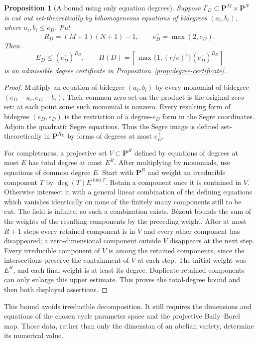 \documentclass[11pt]{article}
\newtheorem{proposition}[theorem]{Proposition}
\theoremstyle{definition}
\theoremstyle{remark}
\begin{document}
\begin{proposition}[A bound using only equation degrees]
\label{prop:bezout-degree}
Suppose $\Gamma_D\subset\mathbf P^M\times\mathbf P^N$
is cut out set-theoretically by bihomogeneous equations of
bidegrees $(a_i,b_i)$, where $a_i,b_i\leq e_D$.
Put
\[
 R_D=(M+1)(N+1)-1,\qquad e_D^+=\max(2,e_D).
\]
Then
\[
 E_D\leq(e_D^+)^{R_D},\qquad
 H(D)=\left\lceil\max\{1,(r/e)^s\}
                       (e_D^+)^{R_D}\right\rceil
\]
is an admissible degree certificate in
Proposition~\ref{prop:degree-certificate}.
\end{proposition}
\begin{proof}
Multiply an equation of bidegree $(a_i,b_i)$ by every
monomial of bidegree $(e_D-a_i,e_D-b_i)$.
Their common zero set on the product is the original zero
set: at each point some such monomial is nonzero.
Every resulting form of bidegree $(e_D,e_D)$ is the restriction
of a degree-$e_D$ form in the Segre coordinates.  Adjoin the
quadratic Segre equations.  Thus the Segre image is defined
set-theoretically in $\mathbf P^{R_D}$ by forms of degrees
at most $e_D^+$.

For completeness, a projective set $V\subset\mathbf P^R$
defined by equations of degrees at most $E$ has total degree
at most $E^R$.  After multiplying by monomials, use equations
of common degree $E$.  Start with $\mathbf P^R$ and weight an
irreducible component $T$ by $\deg(T)E^{\dim T}$.
Retain a component once it is contained in $V$.  Otherwise
intersect it with a general linear combination of the defining
equations which vanishes identically on none of the finitely
many components still to be cut.  The field is infinite, so
such a combination exists.  B\'ezout bounds the sum of the
weights of the resulting components by the preceding weight.
After at most $R+1$ steps every retained component is in $V$
and every other component has disappeared; a zero-dimensional
component outside $V$ disappears at the next step.
Every irreducible component of $V$ is among the retained
components, since the intersections preserve the containment
of $V$ at each step.  The initial weight was $E^R$, and each
final weight is at least its degree.  Duplicate retained
components can only enlarge this upper estimate.  This proves
the total-degree bound and then both displayed assertions.
\end{proof}

This bound avoids irreducible decomposition.  It still requires
the dimensions and equations of the chosen cycle parameter
space and the projective Baily--Borel map.  Those data, rather
than only the dimension of an abelian variety, determine its
numerical value.
\end{document}
